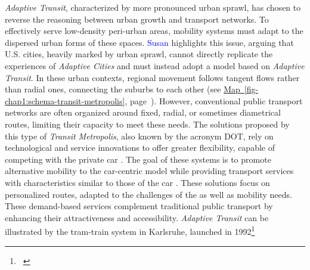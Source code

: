 \begin{refsegment}
\textsl{Adaptive Transit}, characterized by more pronounced urban sprawl, has chosen to reverse the reasoning between urban growth and transport networks. To effectively serve low-density peri-urban areas, mobility systems must adapt to the dispersed urban forms of these spaces. \textcolor{blue}{Susan} \textcolor{blue}{\textcite[108]{handy_reviews_1999}} highlights this issue, arguing that U.S. cities, heavily marked by urban sprawl, cannot directly replicate the experiences of \textsl{Adaptive Cities} and must instead adopt a model based on \textsl{Adaptive Transit}. In these urban contexts, regional movement follows tangent flows rather than radial ones, connecting the suburbs to each other (see \hyperref[fig-chap1:schema-transit-metropolis]{Map~\ref{fig-chap1:schema-transit-metropolis}}, page~\pageref{fig-chap1:schema-transit-metropolis}). However, conventional public transport networks are often organized around fixed, radial, or sometimes diametrical routes, limiting their capacity to meet these needs. The solutions proposed by this type of \textsl{Transit Metropolis}, also known by the acronym \acrfull{DOT}, rely on technological and service innovations to offer greater flexibility, capable of competing with the private car \textcolor{blue}{\autocite[132]{cervero_transit_2020}}. The goal of these systems is to promote alternative mobility to the car-centric model while providing transport services with characteristics similar to those of the car \textcolor{blue}{\autocite[67-68]{bourdin_major_2024}}. These solutions focus on personalized routes, adapted to the challenges of the  as well as  mobility needs. These demand-based services complement traditional public transport by enhancing their attractiveness and accessibility. \textsl{Adaptive Transit} can be illustrated by the tram-train system in Karlsruhe, launched in 1992\footnote{~
}
\end{refsegment}
